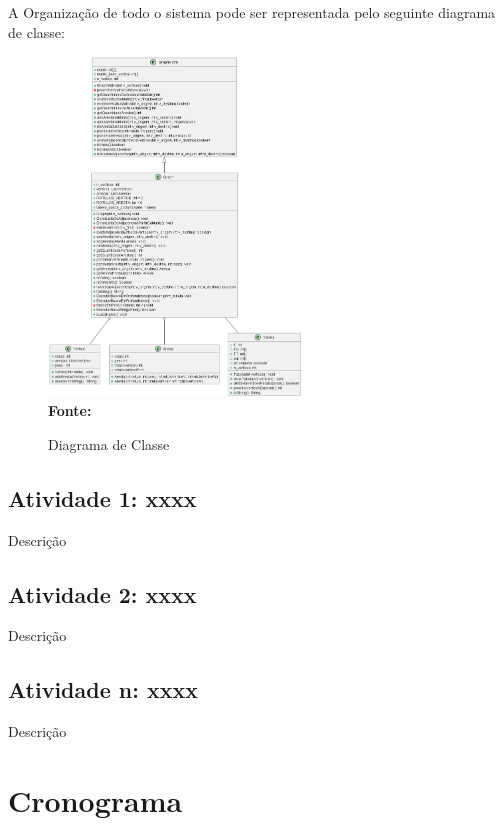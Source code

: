 A Organização de todo o sistema pode ser representada pelo seguinte diagrama de classe:

\begin{figure}[ht]
	\centering	
	\caption[\hspace{0.1cm}Diagrama Classe]{Diagrama de Classe}
	\vspace{-0.4cm}
	\includegraphics[width=0.6\textwidth]{DiagramaDeClasse/DiagramaDeClasse.png}
	 \vspace{-0.2cm}
	\\\textbf{\footnotesize Fonte: \cite{imagemSoftware} }
	\label{fig:imagemSoftware}
\end{figure}

\subsection{Atividade 1: xxxx}
Descrição

\subsection{Atividade 2: xxxx}
Descrição

\subsection{Atividade n: xxxx}
Descrição

\section{Cronograma}


